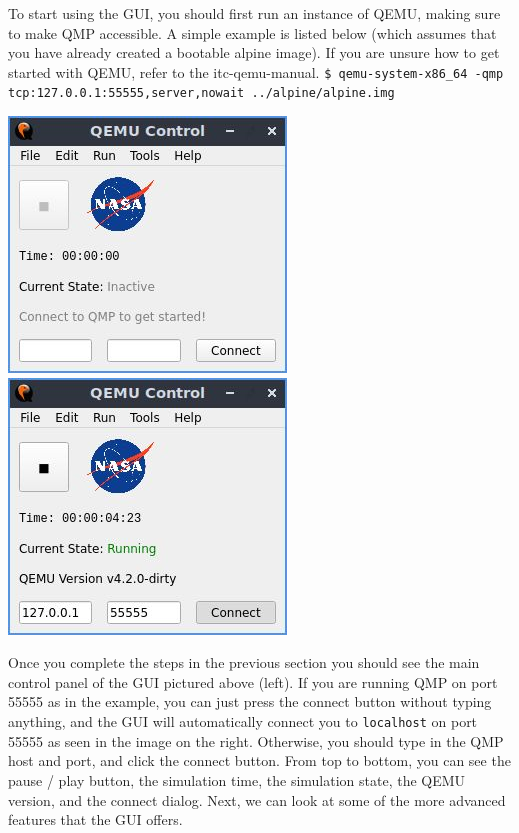 \documentclass{article}
\newcommand{\code}[1]{\texttt{#1}}
\begin{document}
To start using the GUI, you should first run an instance of QEMU, making sure to make QMP accessible. A simple example is listed below (which assumes that you have already created a bootable alpine image). If you are unsure how to get started with QEMU, refer to the itc-qemu-manual. \newline \newline
\code{\$ qemu-system-x86\_64 -qmp tcp:127.0.0.1:55555,server,nowait  ../alpine/alpine.img}
\newline

\begin{center}
    \includegraphics[]{images/main_inactive.jpg}
    \includegraphics[]{images/main_active.jpg}
\end{center}
Once you complete the steps in the previous section you should see the main control panel of the GUI pictured above (left). If you are running QMP on port 55555 as in the example, you can just press the connect button without typing anything, and the GUI will automatically connect you to \code{localhost} on port 55555 as seen in the image on the right. Otherwise, you should type in the QMP host and port, and click the connect button. From top to bottom, you can see the pause / play button, the simulation time, the simulation state, the QEMU version, and the connect dialog. Next, we can look at some of the more advanced features that the GUI offers.
\end{document}
